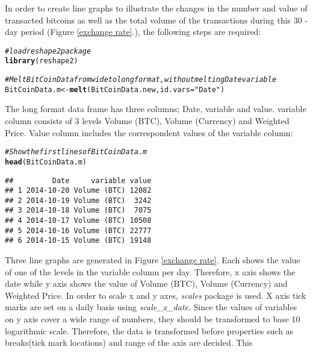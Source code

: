 \documentclass{article}\usepackage[]{graphicx}\usepackage[]{color}
\makeatletter
\newcommand{\hlstr}[1]{\textcolor[rgb]{0.192,0.494,0.8}{#1}}%
\newcommand{\hlcom}[1]{\textcolor[rgb]{0.678,0.584,0.686}{\textit{#1}}}%
\newcommand{\hlstd}[1]{\textcolor[rgb]{0.345,0.345,0.345}{#1}}%
\newcommand{\hlkwb}[1]{\textcolor[rgb]{0.69,0.353,0.396}{#1}}%
\newcommand{\hlkwc}[1]{\textcolor[rgb]{0.333,0.667,0.333}{#1}}%
\newcommand{\hlkwd}[1]{\textcolor[rgb]{0.737,0.353,0.396}{\textbf{#1}}}%
\newenvironment{kframe}{%
 \def\at@end@of@kframe{}%
 \ifinner\ifhmode%
  \def\at@end@of@kframe{\end{minipage}}%
  \begin{minipage}{\columnwidth}%
 \fi\fi%
 \def\FrameCommand##1{\hskip\@totalleftmargin \hskip-\fboxsep
 \colorbox{shadecolor}{##1}\hskip-\fboxsep
     \hskip-\linewidth \hskip-\@totalleftmargin \hskip\columnwidth}%
 \MakeFramed {\advance\hsize-\width
   \@totalleftmargin\z@ \linewidth\hsize
   \@setminipage}}%
 {\par\unskip\endMakeFramed%
 \at@end@of@kframe}
\newenvironment{knitrout}{}{} %
\makeatother
\begin{document}
In order to create line graphs to illustrate the changes in the number and value of 
transacted bitcoins as well as the total volume of the transactions during this 30
-day period (Figure \ref{exchange rate}.), the following steps are required:
\begin{knitrout}
\color{fgcolor}\begin{kframe}
\begin{alltt}
\hlcom{#load reshape2 package}
\hlkwd{library}\hlstd{(reshape2)}

\hlcom{#Melt BitCoinData from wide to long format, without melting Date variable}
\hlstd{BitCoinData.m} \hlkwb{<-} \hlkwd{melt}\hlstd{(BitCoinData.new,}\hlkwc{id.vars}\hlstd{=}\hlstr{"Date"}\hlstd{)}
\end{alltt}
\end{kframe}
\end{knitrout}
The long format data frame has three columns; Date, variable and value. variable 
column consists of 3 levels Volume (BTC), Volume (Currency) and Weighted Price. 
Value column includes the correspondent values of the variable column:
\begin{knitrout}
\color{fgcolor}\begin{kframe}
\begin{alltt}
\hlcom{#Show the first lines of BitCoinData.m}
\hlkwd{head}\hlstd{(BitCoinData.m)}
\end{alltt}
\begin{verbatim}
##         Date     variable value
## 1 2014-10-20 Volume (BTC) 12082
## 2 2014-10-19 Volume (BTC)  3242
## 3 2014-10-18 Volume (BTC)  7075
## 4 2014-10-17 Volume (BTC) 10508
## 5 2014-10-16 Volume (BTC) 22777
## 6 2014-10-15 Volume (BTC) 19148
\end{verbatim}
\end{kframe}
\end{knitrout}
Three line graphs are generated in Figure \ref{exchange rate}. Each shows the value 
of one of the levels in the variable column per day. Therefore, x axis shows the 
date while y axis shows the value of Volume (BTC), Volume (Currency) and Weighted 
Price. In order to scale x and y axes, \emph{scales} package is used. X axis tick 
marks are set on a daily basis using \emph{scale\_x\_date}. Since the values of 
variables on y axis cover a wide range of numbers, they should be transformed to 
base 10 logarithmic scale. Therefore, the data is transformed before properties 
such as breaks(tick mark locations) and range of the axis are decided. This 
\end{document}
